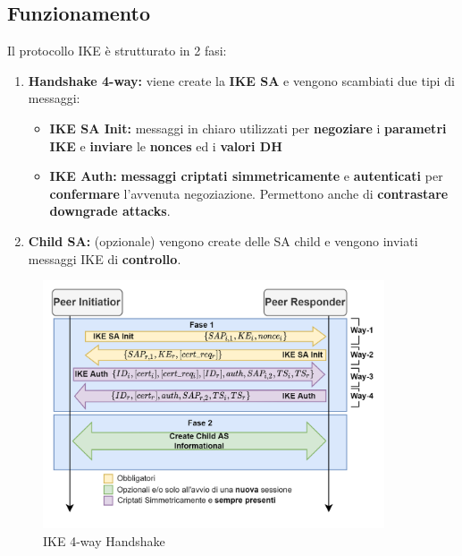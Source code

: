 \subsection{Funzionamento}
Il protocollo IKE è strutturato in 2 fasi:
\begin{proposition}
\begin{enumerate}
    \item \textbf{Handshake 4-way:} viene create la \textbf{IKE SA} e vengono scambiati due tipi di messaggi:
\begin{itemize}
    \item \textbf{IKE SA Init:} messaggi in chiaro utilizzati per \textbf{negoziare} i \textbf{parametri IKE}\footnotemark
     e \textbf{inviare} le \textbf{nonces} ed i \textbf{valori DH}\footnotemark
    \item \textbf{IKE Auth:} \textbf{messaggi criptati simmetricamente} e \textbf{autenticati} per \textbf{confermare} l'avvenuta negoziazione. Permettono anche di \textbf{contrastare downgrade attacks}.
\end{itemize}
\item \textbf{Child SA:} (opzionale) vengono create delle SA child e vengono inviati messaggi IKE di \textbf{controllo}.
\end{enumerate}
\end{proposition}
\begin{figure}[h]
    \centering
    \includegraphics[width=0.9\textwidth]{image/ikev2.png}
    \caption{IKE 4-way Handshake}
    \label{fig:ikev2}
\end{figure}
